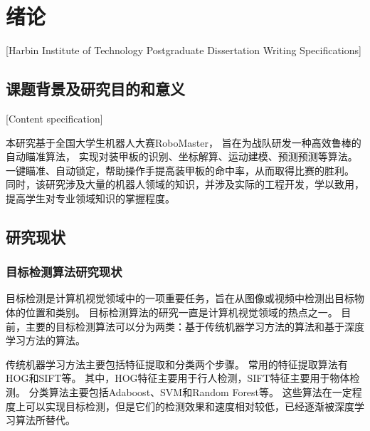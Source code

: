 
\chapter[绪论]{绪论}[Harbin Institute of Technology Postgraduate Dissertation Writing Specifications]

\section{课题背景及研究目的和意义}[Content specification]

本研究基于全国大学生机器人大赛RoboMaster，
旨在为战队研发一种高效鲁棒的自动瞄准算法，
实现对装甲板的识别、坐标解算、运动建模、预测预测等算法。
一键瞄准、自动锁定，帮助操作手提高装甲板的命中率，从而取得比赛的胜利。
同时，该研究涉及大量的机器人领域的知识，并涉及实际的工程开发，学以致用，提高学生对专业领域知识的掌握程度。

\section{研究现状}

\subsection{目标检测算法研究现状}
目标检测是计算机视觉领域中的一项重要任务，旨在从图像或视频中检测出目标物体的位置和类别。
目标检测算法的研究一直是计算机视觉领域的热点之一。
目前，主要的目标检测算法可以分为两类：基于传统机器学习方法的算法和基于深度学习方法的算法。\par


传统机器学习方法主要包括特征提取和分类两个步骤。
常用的特征提取算法有HOG\cite{pang2011efficient}和SIFT等。
其中，HOG特征主要用于行人检测，SIFT特征主要用于物体检测。
分类算法主要包括Adaboost、SVM和Random Forest等。
这些算法在一定程度上可以实现目标检测，但是它们的检测效果和速度相对较低，已经逐渐被深度学习算法所替代。

\par

